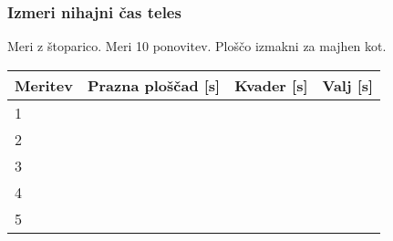 \documentclass[11pt, a4paper]{article}
\begin{document}
\subsubsection{Izmeri nihajni čas teles}

Meri z štoparico. Meri 10 ponovitev. Ploščo izmakni za majhen kot.

\begin{center}
\begin{tabular}{|l|l|l|l|}
\hline
Meritev & Prazna ploščad [s] & Kvader [s] & Valj  [s] \\ \hline
1       &                &        &      \\ \hline
2       &                &        &      \\ \hline
3       &                &        &      \\ \hline
4       &                &        &      \\ \hline
5       &                &        &      \\ \hline
\end{tabular}
\end{center}
\end{document}
